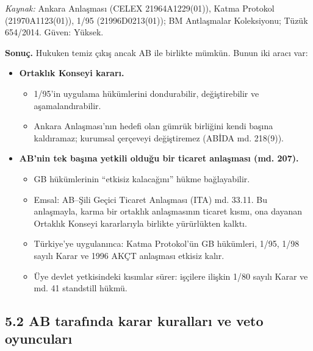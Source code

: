 \endgroup

\emph{Kaynak:} \etiketV{} Ankara Anlaşması (CELEX 21964A1229(01)), Katma Protokol (21970A1123(01)), 1/95 (21996D0213(01)); BM Antlaşmalar Koleksiyonu; Tüzük 654/2014. Güven: Yüksek.

\textbf{Sonuç.} Hukuken temiz çıkış ancak AB ile birlikte mümkün. Bunun iki aracı var:

\begin{itemize}
\tightlist
\item
  \textbf{Ortaklık Konseyi kararı.}

  \begin{itemize}
  \tightlist
  \item
    1/95'in uygulama hükümlerini dondurabilir, değiştirebilir ve aşamalandırabilir.
  \item
    Ankara Anlaşması'nın hedefi olan gümrük birliğini kendi başına kaldıramaz; kurumsal çerçeveyi değiştiremez (ABİDA md. 218(9)).
  \end{itemize}
\item
  \textbf{AB'nin tek başına yetkili olduğu bir ticaret anlaşması (md. 207).}

  \begin{itemize}
  \tightlist
  \item
    GB hükümlerinin ``etkisiz kalacağını'' hükme bağlayabilir.
  \item
    Emsal: AB--Şili Geçici Ticaret Anlaşması (ITA) md. 33.11. Bu anlaşmayla, karma bir ortaklık anlaşmasının ticaret kısmı, ona dayanan Ortaklık Konseyi kararlarıyla birlikte yürürlükten kalktı.
  \item
    Türkiye'ye uygulanınca: Katma Protokol'ün GB hükümleri, 1/95, 1/98 sayılı Karar ve 1996 AKÇT anlaşması etkisiz kalır.
  \item
    Üye devlet yetkisindeki kısımlar sürer: işçilere ilişkin 1/80 sayılı Karar ve md. 41 standstill hükmü.
  \end{itemize}
\end{itemize}

\hypertarget{02b_secenekler_hukuk-52-ab-tarafux131nda-karar-kurallarux131-ve-veto-oyuncularux131}{%
\subsection{5.2 AB tarafında karar kuralları ve veto oyuncuları}\label{02b_secenekler_hukuk-52-ab-tarafux131nda-karar-kurallarux131-ve-veto-oyuncularux131}}

\begingroup\gbtablo\small

